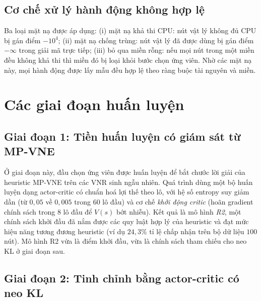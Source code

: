 \documentclass[../DoAn.tex]{subfiles}
\begin{document}
\subsection{Cơ chế xử lý hành động không hợp lệ}
\label{subsec:env-mask}

Ba loại mặt nạ được áp dụng: (i) mặt nạ khả thi CPU: nút vật lý không đủ CPU bị gán điểm $-10^4$; (ii) mặt nạ chống trùng: nút vật lý đã được dùng bị gán điểm $-\infty$ trong giải mã trực tiếp; (iii) bỏ qua miền rỗng: nếu mọi nút trong một miền đều không khả thi thì miền đó bị loại khỏi bước chọn ứng viên. Nhờ các mặt nạ này, mọi hành động được lấy mẫu đều hợp lệ theo ràng buộc tài nguyên và miền.

\section{Các giai đoạn huấn luyện}   %
\label{sec:training}

\subsection{Giai đoạn 1: Tiền huấn luyện có giám sát từ MP-VNE}
\label{subsec:train-il}

Ở giai đoạn này, đầu chọn ứng viên được huấn luyện để bắt chước lời giải của heuristic MP-VNE trên các VNR sinh ngẫu nhiên. Quá trình dùng một bộ huấn luyện dạng actor-critic có chuẩn hoá lợi thế theo lô, với hệ số entropy suy giảm dần (từ $0{,}05$ về $0{,}005$ trong $60$ lô đầu) và cơ chế \textit{khởi động critic} (hoãn gradient chính sách trong $8$ lô đầu để $V(s)$ bớt nhiễu). Kết quả là mô hình \textit{R2}, một chính sách khởi đầu đã nắm được các quy luật hợp lý của heuristic và đạt mức hiệu năng tương đương heuristic (ví dụ $24{,}3\%$ tỉ lệ chấp nhận trên bộ dữ liệu $100$ nút). Mô hình R2 vừa là điểm khởi đầu, vừa là chính sách tham chiếu cho neo KL ở giai đoạn sau.

\subsection{Giai đoạn 2: Tinh chỉnh bằng actor-critic có neo KL}
\label{subsec:train-ac}
\end{document}
